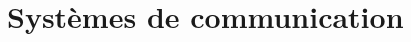 \documentclass[resume]{subfiles}
\begin{document}
\section{Systèmes de communication}
\end{document}
